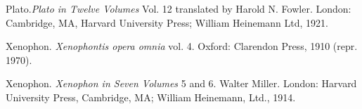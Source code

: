 \documentclass[a4paper,twocolumn,twoside,notitlepage,10pt]{article}
\begin{document}
\begin{description} %
 	\item Plato.\emph{Plato in Twelve Volumes} Vol. 12 translated by Harold N. Fowler. London: Cambridge, MA, Harvard University Press; William Heinemann Ltd, 1921.
	\item Xenophon. \emph{Xenophontis opera omnia} vol. 4. Oxford: Clarendon Press, 1910 (repr. 1970).
	\item Xenophon. \emph{Xenophon in Seven Volumes} 5 and 6. Walter Miller. London: Harvard University Press, Cambridge, MA; William Heinemann, Ltd., 1914.
\end{description}

\onecolumn
\end{document}
